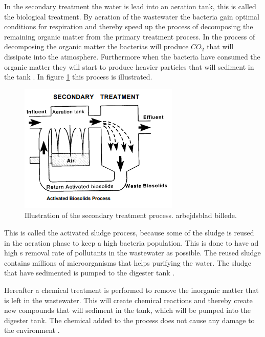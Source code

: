 In the secondary treatment the water is lead into an aeration tank, this is called the biological treatment. By aeration of the wastewater the bacteria gain optimal conditions for respiration and thereby speed up the process of decomposing the remaining organic matter from the primary treatment process. In the process of decomposing the organic matter the bacterias will produce $CO_2$ that will dissipate into the atmosphere. Furthermore when the bacteria have consumed the organic matter they will start to produce heavier particles that will sediment in the tank \cite{wwtp_ekstra}. In figure \ref{fig:secondary_treatment} this process is illustrated.



\begin{figure}[H]
\centering
\includegraphics[width=.6\textwidth]{report/introduction/pictures/secondary_treatment.png}
\caption{Illustration of the secondary treatment process. arbejdsblad billede. }
\label{fig:secondary_treatment}%
\end{figure} 

This is called the activated sludge process, because some of the sludge is reused in the aeration phase to keep a high bacteria population. This is done to have ad high s removal rate of pollutants in the wastewater as possible. The reused sludge contains millions of microorganisms that helps purifying the water. The sludge that have sedimented is pumped to the digester tank \cite{epa_wwtp}.

Hereafter a chemical treatment is performed to remove the inorganic matter that is left in the wastewater. This will create chemical reactions and thereby create new compounds that will sediment in the tank, which will be pumped into the digester tank. The chemical added to the process does not cause any damage to the environment \cite{youtube_wastewater}.

